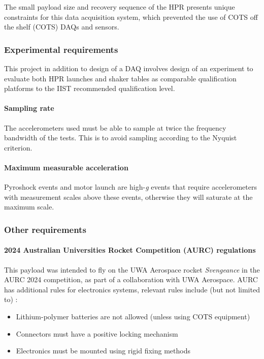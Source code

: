 \documentclass[a4paper,11pt]{article}
\begin{document}
The small payload size and recovery sequence of the HPR presents unique constraints for this data acquisition system, which prevented the use of COTS off the shelf (COTS) DAQs and sensors.

\subsubsection{Experimental requirements}

This project in addition to design of a DAQ involves design of an experiment to evaluate both HPR launches and shaker tables as comparable qualification platforms to the IIST recommended qualification level.

\paragraph{Sampling rate} The accelerometers used must be able to sample at twice the frequency bandwidth of the tests. This is to avoid sampling according to the Nyquist criterion.

\paragraph{Maximum measurable acceleration} Pyroshock events and motor launch are high-\textit{g} events that require accelerometers with measurement scales above these events, otherwise they will saturate at the maximum scale.

\subsubsection{Other requirements}

\paragraph{2024 Australian Universities Rocket Competition (AURC) regulations} This payload was intended to fly on the UWA Aerospace rocket \textit{Svengeance} in the AURC 2024 competition, as part of a collaboration with UWA Aerospace. AURC has additional rules for electronics systems, relevant rules include (but not limited to) \cite{ayaa2023specifications}:
\begin{itemize}
  \item Lithium-polymer batteries are not allowed (unless using COTS equipment)
  \item Connectors must have a positive locking mechanism
  \item Electronics must be mounted using rigid fixing methods
\end{itemize}
\end{document}
